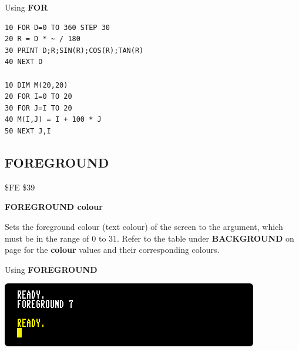 \begin{description}[leftmargin=2cm,style=nextline]
\item [Examples:] Using {\bf FOR}
\begin{tcolorbox}[colback=black,coltext=white]
\verbatimfont{\codefont}
\begin{verbatim}
10 FOR D=0 TO 360 STEP 30
20 R = D * ~ / 180
30 PRINT D;R;SIN(R);COS(R);TAN(R)
40 NEXT D

10 DIM M(20,20)
20 FOR I=0 TO 20
30 FOR J=I TO 20
40 M(I,J) = I + 100 * J
50 NEXT J,I
\end{verbatim}
\end{tcolorbox}
\end{description}


\newpage
\subsection{FOREGROUND}
\begin{description}[leftmargin=2cm,style=nextline]
\item [Token:] \$FE \$39
\item [Format:] {\bf FOREGROUND colour}
\item [Usage:] Sets the foreground colour
               (text colour) of the screen to the argument,
               which must be in the
               range of 0 to 31.
               Refer to the table under
               {\bf BACKGROUND} on page \pageref{colourtable}
               for the {\bf colour} values and their corresponding colours.

\item [Example:] Using {\bf FOREGROUND}
\item \begin{center}\includegraphics[width=0.7\linewidth]{images/foreground-example.png}\end{center}
\end{description}


\newpage
